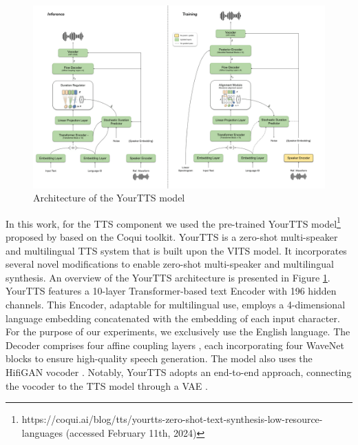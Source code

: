 \begin{figure}
    \begin{center}
        \includegraphics[scale=0.4]{imgs/YourTTS.png}
        \caption{Architecture of the YourTTS model\protect\footnotemark}
        \label{fig:YourTTS}
    \end{center}
\end{figure}

In this work, for the \ac{TTS} component we used the pre-trained YourTTS model\footnote{https://coqui.ai/blog/tts/yourtts-zero-shot-text-synthesis-low-resource-languages (accessed February 11th, 2024)} proposed by \cite{casanova2022yourtts} based on the  Coqui toolkit. YourTTS is a zero-shot multi-speaker and multilingual \ac{TTS} system that is built upon the \ac{VITS} model. It incorporates several novel modifications to enable zero-shot multi-speaker and multilingual synthesis. An overview of the YourTTS architecture is presented in Figure \ref{fig:YourTTS}.
YourTTS features a 10-layer Transformer-based text Encoder with 196 hidden channels. This Encoder, adaptable for multilingual use, employs a 4-dimensional language embedding concatenated with the embedding of each input character. For the purpose of our experiments, we exclusively use the English language. The Decoder comprises four affine coupling layers \cite{45819}, each incorporating four WaveNet blocks \cite{45774} to ensure high-quality speech generation. The model also uses the HifiGAN vocoder \cite{kong2020hifi}. Notably, YourTTS adopts an end-to-end approach, connecting the vocoder to the \ac{TTS} model through a \ac{VAE} \cite{VAE}.


